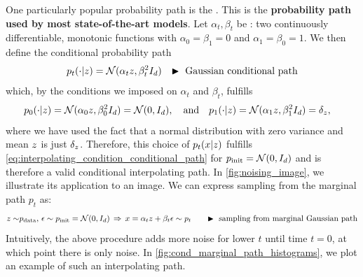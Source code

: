 \begin{examplebox}
\label{example:gaussian_path}
    One particularly popular probability path is the . This is the \textbf{probability path used by most state-of-the-art models}. Let $\alpha_t,\beta_t$ be : two continuously differentiable, monotonic functions with $\alpha_0=\beta_1=0$ and $\alpha_1=\beta_0=1$. We then define the conditional probability path
\begin{align}
\label{eq:gaussian_conditional_probability_paths}
p_t(\cdot|z) &= \mathcal{N}(\alpha_t z,\beta_t^2 I_d)
& \blacktriangleright \,\, \text{Gaussian conditional path}
\end{align}
which, by the conditions we imposed on $\alpha_t$ and $\beta_t$, fulfills
\begin{align*}
    p_0(\cdot|z) &= \mathcal{N}(\alpha_0 z,\beta_0^2 I_d) = \mathcal{N}(0,I_d),\quad \text{and}\quad
p_1(\cdot|z) = \mathcal{N}(\alpha_1 z,\beta_1^2 I_d) = \delta_{z},
\end{align*}
where we have used the fact that a normal distribution with zero variance and mean $z$ is just $\delta_{z}$. Therefore, this choice of $p_t(x|z)$ fulfills \cref{eq:interpolating_condition_conditional_path} for $p_{\rm{init}}=\mathcal{N}(0,I_d)$ and is therefore a valid conditional interpolating path.
In \cref{fig:noising_image}, we illustrate its application to an image. We can express sampling from the marginal path $p_t$ as: 
\begin{align}
    \label{eq:gaussian_prob_path_sampling}
    z\sim&p_{\rm{data}},\,\epsilon\sim p_{\rm{init}} = \mathcal{N}(0,I_d) \,\Rightarrow\, x=\alpha_tz+\beta_t \epsilon\sim p_t \quad &\blacktriangleright \,\,\text{sampling from marginal Gaussian path}
\end{align}
Intuitively, the above procedure adds more noise for lower $t$ until time $t=0$, at which point there is only noise. In \cref{fig:cond_marginal_path_histograms}, we plot an example of such an interpolating path.
\end{examplebox}


